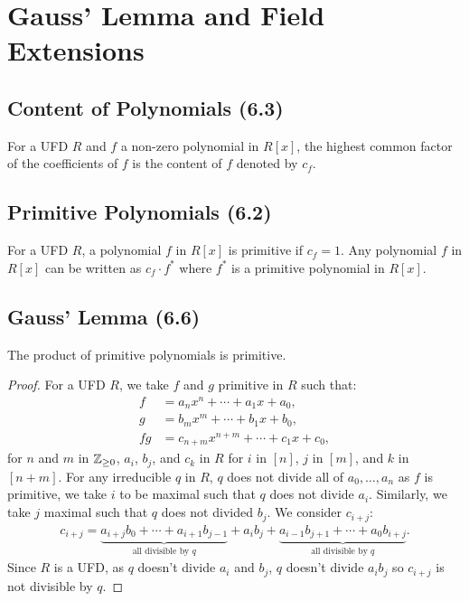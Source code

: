 \section{Gauss' Lemma and Field Extensions}

\subsection{Content of Polynomials (6.3)} \label{6.3}

For a UFD $R$ and $f$ a non-zero polynomial in $R[x]$, the highest common factor of
the coefficients of $f$ is the content of $f$ denoted by $c_f$.

\subsection{Primitive Polynomials (6.2)} \label{6.2}

For a UFD $R$, a polynomial $f$ in $R[x]$ is primitive if $c_f = 1$.
Any polynomial $f$ in $R[x]$ can be written as $c_f \cdot f^\ast$
where $f^\ast$ is a primitive polynomial in $R[x]$.

\subsection{Gauss' Lemma (6.6)} \label{6.6}

The product of primitive polynomials is primitive.

\begin{proof}
    For a UFD $R$, we take $f$ and $g$ primitive in $R$ such that: \begin{align*}
        f &= a_nx^n + \cdots + a_1x + a_0, \\
        g &= b_mx^m + \cdots + b_1x + b_0, \\
        fg &= c_{n + m}x^{n + m} + \cdots + c_1x + c_0,
    \end{align*} for $n$ and $m$ in $\mathbb{Z}_{\geq 0}$, $a_i$, $b_j$, and $c_k$ in
    $R$ for $i$ in $[n]$, $j$ in $[m]$, and $k$ in $[n + m]$. For any irreducible $q$
    in $R$, $q$ does not divide all of $a_0, \ldots, a_n$ as $f$ is primitive, we take
    $i$ to be maximal such that $q$ does not divide $a_i$. Similarly, we take $j$
    maximal such that $q$ does not divided $b_j$. We consider $c_{i + j}$: \begin{align*}
        c_{i + j} = 
        \underbrace{a_{i + j}b_0 + \cdots + a_{i + 1}b_{j - 1}}_{\text{all divisible by } q}
        + a_ib_j
        + \underbrace{a_{i - 1}b_{j + 1} + \cdots + a_0b_{i + j}}_{\text{all divisible by } q}.
    \end{align*} Since $R$ is a UFD, as $q$ doesn't divide $a_i$ and $b_j$, $q$ doesn't divide
    $a_ib_j$ so $c_{i + j}$ is not divisible by $q$.
\end{proof}

